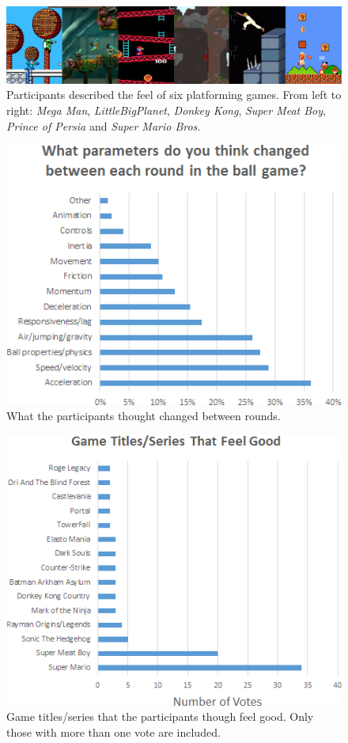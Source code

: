 \begin{figure}[htbp]
\centering
\includegraphics[width=1\textwidth]{Pics/rate_games_all}
\caption{Participants described the feel of six platforming games. From left to right: \textit{Mega Man}, \textit{LittleBigPlanet}, \textit{Donkey Kong}, \textit{Super Meat Boy}, \textit{Prince of Persia} and \textit{Super Mario Bros.}}
\label{fig:rate_games_all}
\end{figure}

\begin{figure}[htbp]
\centering
\includegraphics[width=0.9\columnwidth]{Pics/whatChanged}
\caption{What the participants thought changed between rounds.}
\label{fig:whatChanged}
\end{figure}

\begin{figure}[htbp]
\centering
\includegraphics[width=0.9\columnwidth]{Pics/good_games}
\caption{Game titles/series that the participants though feel good. Only those with more than one vote are included.}
\label{fig:good_games}
\end{figure}


